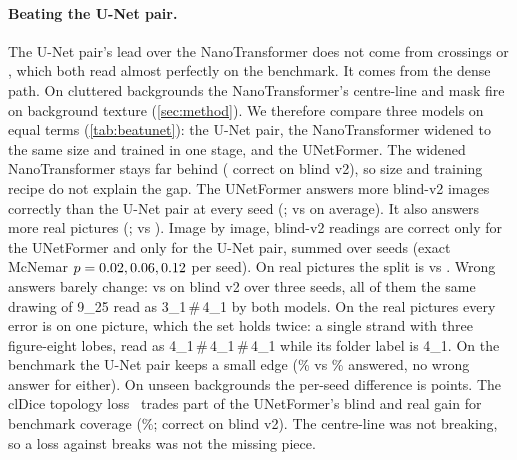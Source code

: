\begin{table}[t]
\centering\footnotesize
\setlength{\tabcolsep}{\widetabcolsep}
\caption{\textbf{Matched comparison with the U-Net pair.} Same data (3{,}000 renders), same one-stage
recipe (12 epochs), same device (Apple GPU), and the same parser (with the clutter filter).
Mean$\pm$sd over three seeds; wrong answers are summed over seeds. Blind v2 has 312 images, real 166.}
\label{tab:beatunet}
\end{table}

\paragraph{Beating the U-Net pair.} The U-Net pair's lead over the NanoTransformer does not come from
crossings or \ou{}, which both read almost perfectly on the benchmark. It comes from the dense path. On
cluttered backgrounds the NanoTransformer's centre-line and mask fire on background texture
(\cref{sec:method}). We therefore compare three models on equal terms (\cref{tab:beatunet}): the U-Net
pair, the NanoTransformer widened to the same size and trained in one stage, and the UNetFormer. The
widened NanoTransformer stays far behind (\BUNanoVtwo{} correct on blind v2), so size and training
recipe do not explain the gap. The UNetFormer answers more blind-v2 images correctly than the U-Net
pair at every seed (\BUUfVtwoDiffs; \BUUfVtwo{} vs \BUUnetVtwo{} on average). It also answers more real
pictures (\BUUfRealDiffs; \BUUfReal{} vs \BUUnetReal). Image by image, \BUVtwoOnlyUf{} blind-v2 readings
are correct only for the UNetFormer and \BUVtwoOnlyUnet{} only for the U-Net pair, summed over seeds
(exact McNemar $p=0.02, 0.06, 0.12$ per seed). On real pictures the split is \BURealOnlyUf{} vs
\BURealOnlyUnet. Wrong answers barely change: \BUUfVtwoWrong{} vs \BUUnetVtwoWrong{} on blind v2 over
three seeds, all of them the same drawing of 9\_25 read as 3\_1\,\#\,4\_1 by both models. On the
real pictures every error is on one picture, which the set holds twice: a single strand with three figure-eight lobes,
read as 4\_1\,\#\,4\_1\,\#\,4\_1 while its folder label is 4\_1. On the benchmark the U-Net pair keeps a
small edge (\BUUnetBench\% vs \BUUfBench\% answered, no wrong answer for either). On unseen
backgrounds the per-seed difference is \BUUfUnseenDiffs{} points. The clDice topology
loss~\cite{shit2021cldice} trades part of the UNetFormer's blind and real gain for benchmark coverage
(\BUTopoBench\%; \BUTopoVtwo{} correct on blind v2). The centre-line was not breaking, so a loss
against breaks was not the missing piece.

